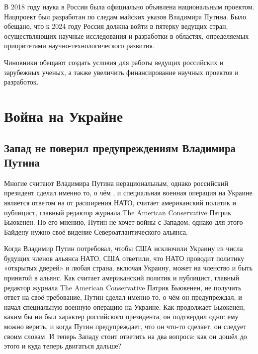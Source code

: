 В 2018 году наука в России была официально объявлена национальным проектом. Нацпроект был разработан по следам майских указов Владимира Путина. Было обещано, что к 2024 году Россия должна войти в пятерку ведущих стран, осуществляющих научные исследования и разработки в областях, определяемых приоритетами научно-технологического развития.

Чиновники  обещают создать  условия для работы ведущих российских и зарубежных ученых, а также увеличить финансирование научных проектов и разработок.




\section{Война на Украйне}
\subsection{Запад не поверил предупреждениям Владимира Путина}

Многие считают Владимира Путина нерациональным, однако российский президент сделал именно то, о чём , и специальная военная операция на Украине является ответом на  от расширения НАТО, считает американский политик и публицист, главный редактор журнала The American Conservative Патрик Бьюкенен. По его мнению, Путин не хочет войны с Западом, однако для этого Байдену нужно  своё видение Североатлантического альянса.

Когда Владимир Путин потребовал, чтобы США исключили Украину из числа будущих членов альянса НАТО, США ответили, что НАТО проводит политику «открытых дверей» и любая страна, включая Украину, может  на членство и быть принятой в альянс. Как считает американский политик и публицист, главный редактор журнала The American Conservative Патрик Бьюкенен, не  получить  ответ на своё требование, Путин сделал именно то, о чём он предупреждал, и начал специальную военную операцию на Украине.
Как продолжает Бьюкенен, каким бы ни был характер российского президента, он подтвердил одно: ему можно верить, и когда Путин предупреждает, что он что-то сделает, он следует своим словам. И теперь Западу стоит ответить на два вопроса: как он дошёл до этого и куда теперь двигаться дальше?

